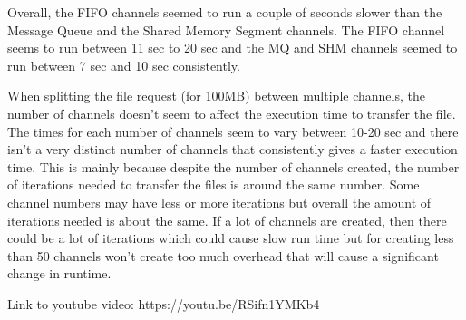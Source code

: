 \documentclass[12pt]{article}
\begin{document}
Overall, the FIFO channels seemed to run a couple of seconds slower than the Message Queue and the Shared Memory Segment channels. The FIFO channel seems to run between 11 sec to 20 sec and the MQ and SHM channels seemed to run between 7 sec and 10 sec consistently. 

When splitting the file request (for 100MB) between multiple channels, the number of channels doesn't seem to affect the execution time to transfer the file. The times for each number of channels seem to vary between 10-20 sec and there isn't a very distinct number of channels that consistently gives a faster execution time. This is mainly because despite the number of channels created, the number of iterations needed to transfer the files is around the same number. Some channel numbers may have less or more iterations but overall the amount of iterations needed is about the same. If a lot of channels are created, then there could be a lot of iterations which could cause slow run time but for creating less than 50 channels won't create too much overhead that will cause a significant change in runtime. 

Link to youtube video: https://youtu.be/RSifn1YMKb4
\end{document}
